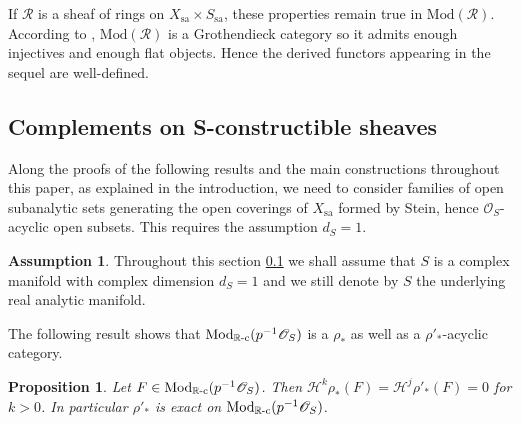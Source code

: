 \documentclass[english]{smfart}
\numberwithin{subsection}{section}
\def\shh{\mathcal{H}}
\def\shh{\mathcal{H}}
\def\sho{\mathcal{O}}\let\cO\sho
\def\shr{\mathcal{R}}
\newcommand{\R}{\mathbb{R}}\let\RR\R
\newcommand{\Mod}{\mathrm{Mod}}
\newcommand{\sa}{\mathrm{sa}}
\newcommand{\rc}{{\R\textup{-c}}}
\newcommand{\pOS}{p^{-1}\sho_S}
\numberwithin{equation}{section}
\theoremstyle{plain}
\newtheorem{proposition}[equation]{Proposition}
\theoremstyle{definition}
\newtheorem{assumption}[equation]{Assumption}
\begin{document}
If $\shr$ is a sheaf of rings on $X_{\sa}\times S_{\sa}$, these properties remain true in $\Mod(\shr)$. According to \cite[Th.\,18.1.6 \& Prop.\,18.5.4]{K-Sch06}, $\Mod(\mathcal{R})$ is a Grothendieck category so it admits enough injectives and enough flat objects. Hence the derived functors appearing in the sequel are well-defined.

\subsection{Complements on S-constructible sheaves}\label{subsec:complements}
Along the proofs of the following results and the main constructions throughout this paper, as explained in the introduction, we need to consider families of open subanalytic sets generating the open coverings of $X_{\sa}$ formed by Stein, hence $\sho_S$-acyclic open subsets. This requires the assumption $d_S=1$.

\begin{assumption}
Throughout this section \ref{subsec:complements} we shall assume that $S$ is a complex manifold with complex dimension $d_S=1$ and we still denote by $S$ the underlying real analytic manifold.
\end{assumption}
The following result shows that $\Mod_\rc(\pOS)$ is a $\rho_*$ as well as a $\rho'_*$-acyclic category.

\begin{proposition}\label{P:236}
Let $F\in \Mod_\rc(\pOS)$. Then $\shh^k\rho_*(F)=\shh^j\rho'_*(F)=0$ for $k>0$. In particular $\rho'_*$ is exact on $\Mod_\rc(\pOS)$.
\end{proposition}
\end{document}
